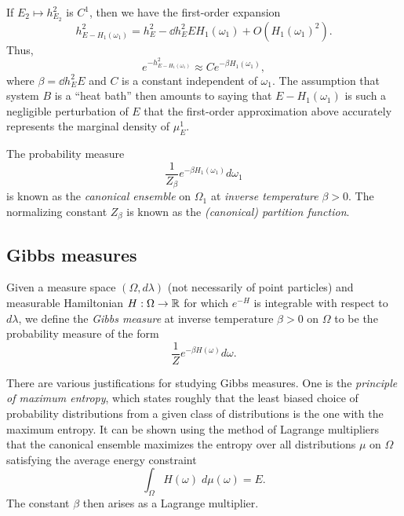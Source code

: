 If $E_2 \mapsto h^2_{E_2}$ is $C^1$, then we have the first-order expansion
\begin{equation}
h^2_{E - H_1(\omega_1)}
  =
h^2_E - \dd{h^2_E}{E} H_1(\omega_1) + O(H_1(\omega_1)^2).
\end{equation}
Thus,
\begin{equation}
e^{-h^2_{E-H_1(\omega_1)}}
  \approx
C e^{-\beta H_1(\omega_1)},
\end{equation}
where $\beta = \dd{h^2_E}{E}$ and $C$ is a constant independent of $\omega_1$.
The assumption that system $B$ is a ``heat bath'' then amounts to saying that
$E - H_1(\omega_1)$ is such a negligible perturbation of $E$ that the first-order
approximation above accurately represents the marginal density of $\mu^1_E$.

The probability measure
\begin{equation}
\frac{1}{Z_\beta} e^{-\beta H_1(\omega_1)} d\omega_1
\end{equation}
is known as the \emph{canonical ensemble} on $\Omega_1$ at \emph{inverse temperature} $\beta > 0$.
The normalizing constant $Z_\beta$ is known as the \emph{(canonical) partition function}.


\subsection{Gibbs measures}

Given a measure space $(\Omega, d\lambda)$ (not necessarily of point particles) and measurable
Hamiltonian $H : \Omega \rightarrow {\mathbb R}$ for which $e^{-H}$ is integrable with respect to $d\lambda$,
we define the \emph{Gibbs measure} at inverse temperature $\beta > 0$
on $\Omega$ to be the probability measure of the form
\begin{equation}
\frac{1}{Z} e^{-\beta H(\omega)} d\omega.
\end{equation}

There are various justifications for studying Gibbs measures.
One is the \emph{principle of maximum entropy}, which states roughly that the least
biased choice of probability distributions from a given class of distributions is the
one with the maximum entropy. It can be shown using the method of Lagrange multipliers
that the canonical ensemble maximizes the
entropy over all distributions $\mu$ on $\Omega$ satisfying the average energy constraint
\begin{equation}
\int_{\Omega} H(\omega) \; d\mu(\omega) = E.
\end{equation}
The constant $\beta$ then arises as a Lagrange multiplier.

